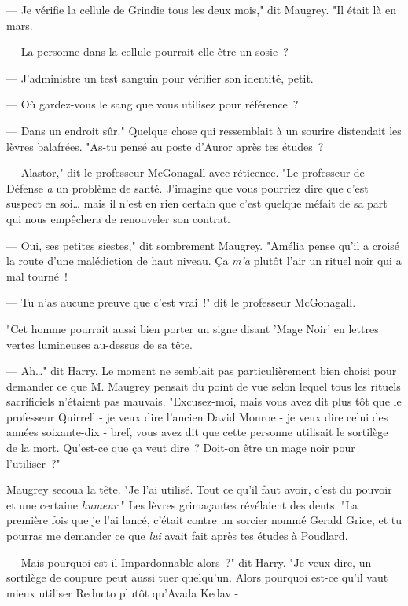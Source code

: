 --- Je vérifie la cellule de Grindie tous les deux mois," dit Maugrey. "Il était là en mars.

--- La personne dans la cellule pourrait-elle être un sosie~?

--- J'administre un test sanguin pour vérifier son identité, petit.

--- Où gardez-vous le sang que vous utilisez pour référence~?

--- Dans un endroit sûr." Quelque chose qui ressemblait à un sourire distendait les lèvres balafrées. "As-tu pensé au poste d'Auror après tes études~?

--- Alastor," dit le professeur McGonagall avec réticence. "Le professeur de Défense \emph{a} un problème de santé. J'imagine que vous pourriez dire que c'est suspect en soi… mais il n'est en rien certain que c'est quelque méfait de sa part qui nous empêchera de renouveler son contrat.

--- Oui, ses petites siestes," dit sombrement Maugrey. "Amélia pense qu'il a croisé la route d'une malédiction de haut niveau. Ça \emph{m'a} plutôt l'air un rituel noir qui a mal tourné~!

--- Tu n'as aucune preuve que c'est vrai~!" dit le professeur McGonagall.

"Cet homme pourrait aussi bien porter un signe disant 'Mage Noir' en lettres vertes lumineuses au-dessus de sa tête.

--- Ah…" dit Harry. Le moment ne semblait pas particulièrement bien choisi pour demander ce que M. Maugrey pensait du point de vue selon lequel tous les rituels sacrificiels n'étaient pas mauvais. "Excusez-moi, mais vous avez dit plus tôt que le professeur Quirrell - je veux dire l'ancien David Monroe - je veux dire celui des années soixante-dix - bref, vous avez dit que cette personne utilisait le sortilège de la mort. Qu'est-ce que ça veut dire~? Doit-on être un mage noir pour l'utiliser~?"

Maugrey secoua la tête. "Je l'ai utilisé. Tout ce qu'il faut avoir, c'est du pouvoir et une certaine \emph{humeur}." Les lèvres grimaçantes révélaient des dents. "La première fois que je l'ai lancé, c'était contre un sorcier nommé Gerald Grice, et tu pourras me demander ce que \emph{lui} avait fait après tes études à Poudlard.

--- Mais pourquoi est-il Impardonnable alors~?" dit Harry. "Je veux dire, un sortilège de coupure peut aussi tuer quelqu'un. Alors pourquoi est-ce qu'il vaut mieux utiliser Reducto plutôt qu'Avada Kedav -

